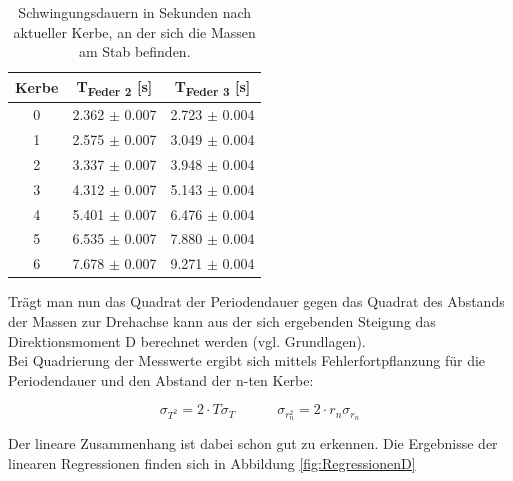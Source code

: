 \documentclass[12pt,a4paper]{article}
\begin{document}
\begin{table}
	\centering
	\caption{Schwingungsdauern in Sekunden nach aktueller Kerbe, an der sich die Massen am Stab befinden.}
	\label{tab:D_T}
	\begin{tabular}{|c|c|c|}
		\hline
		Kerbe & T\textsubscript{Feder 2} [s] & T\textsubscript{Feder 3} [s] \\
		\hline
		0 & 2.362 $\pm$ 0.007 & 2.723 $\pm$ 0.004 \\
		\hline
		1 & 2.575 $\pm$ 0.007 & 3.049 $\pm$ 0.004 \\
		\hline
		2 & 3.337 $\pm$ 0.007 & 3.948 $\pm$ 0.004 \\
		\hline
		3 & 4.312 $\pm$ 0.007 & 5.143 $\pm$ 0.004 \\
		\hline
		4 & 5.401 $\pm$ 0.007 & 6.476 $\pm$ 0.004 \\
		\hline
		5 & 6.535 $\pm$ 0.007 & 7.880 $\pm$ 0.004 \\
		\hline
		6 & 7.678 $\pm$ 0.007 & 9.271 $\pm$ 0.004 \\
		\hline
	\end{tabular}
\end{table}



Trägt man nun das Quadrat der Periodendauer gegen das Quadrat des Abstands der Massen zur Drehachse kann aus der sich ergebenden Steigung das Direktionsmoment D berechnet werden (vgl. Grundlagen).\\

Bei Quadrierung der Messwerte ergibt sich mittels Fehlerfortpflanzung für die Periodendauer und den Abstand der n-ten Kerbe:

\begin{equation}
\sigma_{T^2}=2\cdot T \sigma_T \quad \quad \quad \sigma_{r_n^2}=2\cdot r_n \sigma_{r_n}
\end{equation}

Der lineare Zusammenhang ist dabei schon gut zu erkennen. Die Ergebnisse der linearen Regressionen finden sich in Abbildung \ref{fig:RegressionenD}
\end{document}
